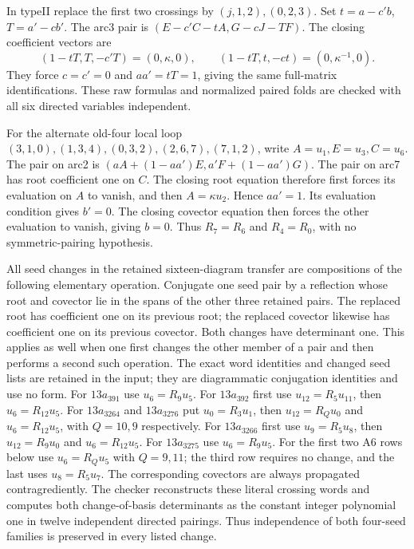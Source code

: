 \documentclass[11pt]{article}
\begin{document}
In typeII replace the first two crossings by $(j,1,2),(0,2,3)$.
Set $t=a-c'b$, $T=a'-cb'$. The arc3 pair is
$(E-c'C-tA,G-cJ-TF)$.
The closing coefficient vectors are
\[
 (1-tT,T,-c'T)=(0,\kappa,0),\qquad
 (1-tT,t,-ct)=(0,\kappa^{-1},0).
\]
They force $c=c'=0$ and $aa'=tT=1$, giving the same full-matrix
identifications. These raw formulas and normalized paired folds are
checked with all six directed variables independent.

For the alternate old-four local loop
$(3,1,0),(1,3,4),(0,3,2),(2,6,7),(7,1,2)$,
write $A=u_1,E=u_3,C=u_6$. The pair on arc2 is
$(aA+(1-aa')E,a'F+(1-aa')G)$.
The pair on arc7 has root coefficient one on $C$.
The closing root equation therefore first forces its evaluation on
$A$ to vanish, and then $A=\kappa u_2$. Hence $aa'=1$.
Its evaluation condition gives $b'=0$. The closing covector equation
then forces the other evaluation to vanish, giving $b=0$.
Thus $R_7=R_6$ and $R_4=R_0$, with no symmetric-pairing hypothesis.

All seed changes in the retained sixteen-diagram transfer are
compositions of the following elementary operation. Conjugate one
seed pair by a reflection whose root and covector lie in the spans
of the other three retained pairs. The replaced root has coefficient
one on its previous root; the replaced covector likewise has
coefficient one on its previous covector. Both changes have
determinant one. This applies as well when one first changes the
other member of a pair and then performs a second such operation.
The exact word identities and changed seed lists are retained in
the input; they are diagrammatic conjugation identities and use no
form. For $13a_{391}$ use $u_6=R_9u_5$. For $13a_{392}$ first use
$u_{12}=R_5u_{11}$, then $u_6=R_{12}u_5$.
For $13a_{3264}$ and $13a_{3276}$ put $u_0=R_3u_1$, then $u_{12}=R_Qu_0$ and
$u_6=R_{12}u_5$, with $Q=10,9$ respectively.
For $13a_{3266}$ first use $u_9=R_5u_8$, then $u_{12}=R_9u_0$ and
$u_6=R_{12}u_5$. For $13a_{3275}$ use $u_6=R_9u_5$.
For the first two A6 rows below use $u_6=R_Qu_5$ with $Q=9,11$;
the third row requires no change, and the last uses $u_8=R_5u_7$.
The corresponding covectors are always propagated contragrediently.
The checker reconstructs these literal crossing words and computes
both change-of-basis determinants as the constant integer polynomial
one in twelve independent directed pairings. Thus independence of
both four-seed families is preserved in every listed change.
\end{document}
